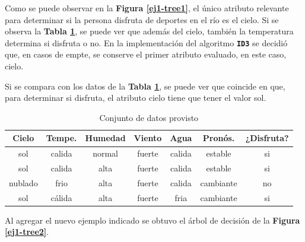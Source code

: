 \documentclass[a4paper]{article}
\newcommand{\bold}[1]{\textbf{\texttt{#1}}}
\newcommand{\reffig}[1]{\textbf{Figura \ref{#1}}}
\newcommand{\reftable}[1]{\textbf{Tabla \ref{#1}}}
\begin{document}
Como se puede observar en la \reffig{ej1-tree1}, el único atributo relevante para determinar si la persona disfruta de deportes en el río es el cielo. Si se observa la \reftable{tab:dataset-1}, se puede ver que además del cielo, también la temperatura determina si disfruta o no. En la implementación del algoritmo \bold{ID3} se decidió que, en casos de empte, se conserve el primer atributo evaluado, en este caso, cielo.

Si se compara con los datos de la \reftable{tab:dataset-1}, se puede ver que coincide en que, para determinar si disfruta, el atributo cielo tiene que tener el valor sol.

\begin{table}[h]
  \centering
  \begin{tabular}{ccccccc}
  Cielo                          & Tempe. & Humedad & Viento & Agua   & Pronós.    & ¿Disfruta?                \\ \hline
  {\color[HTML]{009901} sol}     & calida & normal  & fuerte & calida & estable   & {\color[HTML]{009901} si} \\
  {\color[HTML]{009901} sol}     & calida & alta    & fuerte & calida & estable   & {\color[HTML]{009901} si} \\
  {\color[HTML]{CB0000} nublado} & frio   & alta    & fuerte & calida & cambiante & {\color[HTML]{CB0000} no} \\
  {\color[HTML]{009901} sol}     & cálida & alta    & fuerte & fria   & cambiante & {\color[HTML]{009901} si}
  \end{tabular}
  \caption{Conjunto de datos provisto}
  \label{tab:dataset-1}
  \end{table}

Al agregar el nuevo ejemplo indicado se obtuvo el árbol de decisión de la \reffig{ej1-tree2}.
\end{document}
